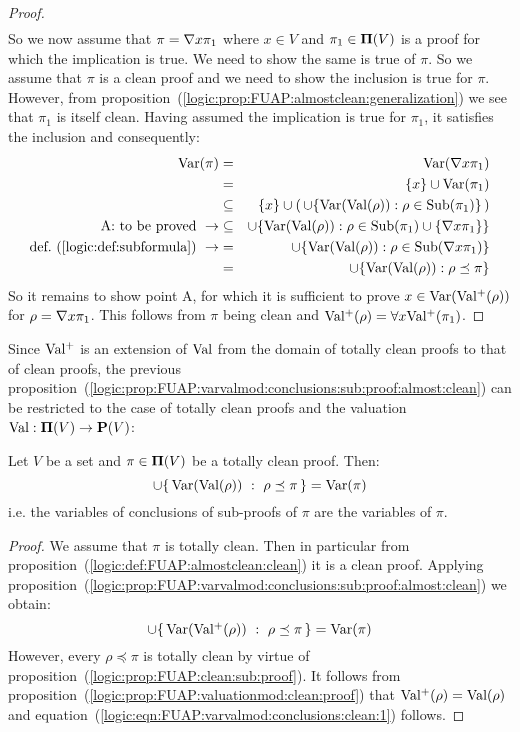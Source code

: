 \begin{proof}
\begin{eqnarray*}
    \end{eqnarray*}
So we now assume that $\pi=\mbox{$\nabla$} x\pi_{1}$ where $x\in V$ and
$\pi_{1}\in\mbox{${\bf\Pi}(V)$}$ is a proof for which the implication is true. We
need to show the same is true of $\pi$. So we assume that $\pi$ is a
clean proof and we need to show the inclusion is true for $\pi$.
However, from
proposition~(\ref{logic:prop:FUAP:almostclean:generalization}) we
see that $\pi_{1}$ is itself clean. Having assumed the implication
is true for $\pi_{1}$,  it satisfies the inclusion and consequently:
    \begin{eqnarray*}
    \mbox{\rm Var}(\pi)&=&\mbox{\rm Var}(\mbox{$\nabla$} x\pi_{1})\\
    &=&\{x\}\cup\mbox{\rm Var}(\pi_{1})\\
    &\subseteq&\{x\}\cup(\,\cup\{\mbox{\rm Var}(\mbox{\rm Val}(\rho)):\rho\in\mbox{\rm Sub}(\pi_{1})\}\,)\\
    \mbox{A: to be proved}\ \rightarrow&\subseteq&
    \cup\{\mbox{\rm Var}(\mbox{\rm Val}(\rho)):\rho\in\mbox{\rm Sub}(\pi_{1})\cup\{\mbox{$\nabla$} x\pi_{1}\}\}\\
    \mbox{def.~(\ref{logic:def:subformula})}\ \rightarrow
    &=&\cup\{\mbox{\rm Var}(\mbox{\rm Val}(\rho)):\rho\in\mbox{\rm Sub}(\mbox{$\nabla$} x\pi_{1})\}\\
    &=&\cup\{\mbox{\rm Var}(\mbox{\rm Val}(\rho)):\rho\preceq\pi\}\\
    \end{eqnarray*}
So it remains to show point A, for which it is sufficient to prove
$x\in\mbox{\rm Var}(\mbox{$\rm Val^{+}$}(\rho))$ for $\rho=\mbox{$\nabla$} x\pi_{1}$. This follows from
$\pi$ being clean and $\mbox{$\rm Val^{+}$}(\rho)=\forall x\mbox{$\rm Val^{+}$}(\pi_{1})$.
\end{proof}

Since $\mbox{$\rm Val^{+}$}$ is an extension of $\mbox{\rm Val}$ from the domain of totally
clean proofs to that of clean proofs, the previous
proposition~(\ref{logic:prop:FUAP:varvalmod:conclusions:sub:proof:almost:clean})
can be restricted to the case of totally clean proofs and the
valuation  $\mbox{\rm Val}:\mbox{${\bf\Pi}(V)$}\to\mbox{${\bf P}(V)$}$:
\begin{prop}\label{logic:prop:FUAP:varvalmod:conclusions:sub:proof:clean}
Let $V$ be a set and $\pi\in\mbox{${\bf\Pi}(V)$}$ be a totally clean proof. Then:
    \begin{equation}\label{logic:eqn:FUAP:varvalmod:conclusions:clean:1}
    \cup\{\,\mbox{\rm Var}(\mbox{\rm Val}(\rho))\ :\
    \rho\preceq\pi\,\}=\mbox{\rm Var}(\pi)
    \end{equation}
i.e. the variables of conclusions of sub-proofs of $\pi$ are the
variables of $\pi$.
\end{prop}
\begin{proof}
We assume that $\pi$ is totally clean. Then in particular from
proposition~(\ref{logic:def:FUAP:almostclean:clean}) it is a clean
proof. Applying
proposition~(\ref{logic:prop:FUAP:varvalmod:conclusions:sub:proof:almost:clean})
we obtain:
    \[
    \cup\{\,\mbox{\rm Var}(\mbox{$\rm Val^{+}$}(\rho))\ :\
    \rho\preceq\pi\,\}=\mbox{\rm Var}(\pi)
    \]
However, every $\rho\preceq\pi$ is totally clean by virtue of
proposition~(\ref{logic:prop:FUAP:clean:sub:proof}). It follows from
proposition~(\ref{logic:prop:FUAP:valuationmod:clean:proof}) that
$\mbox{$\rm Val^{+}$}(\rho)=\mbox{\rm Val}(\rho)$ and
equation~(\ref{logic:eqn:FUAP:varvalmod:conclusions:clean:1})
follows.
\end{proof}

